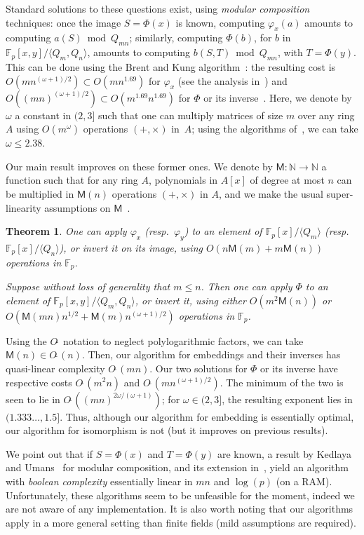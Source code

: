 \documentclass{sig-alternate}
\def\M {\ensuremath{\mathsf{M}}}
\def\N {\ensuremath{\mathbb{N}}}
\def\F {\ensuremath{\mathbb{F}}}
\newcounter{algo}
\newcommand{\ang}[1]{\langle#1\rangle}
\newtheorem{Theo}{Theorem}
\begin{document}
Standard solutions to these questions exist, using {\em modular
  composition} techniques: once the image $S=\Phi(x)$ is known,
computing $\varphi_x(a)$ amounts to computing $a(S) \bmod Q_{mn}$;
similarly, computing $\Phi(b)$, for $b$ in $\F_p[x,y]/\ang{Q_m,Q_n}$,
amounts to computing $b(S,T) \bmod Q_{mn}$, with $T=\Phi(y)$.  This
can be done using the Brent and Kung algorithm~\cite{brent+kung}: the
resulting cost is $O(m n^{(\omega+1)/2}) \subset O(m n^{1.69})$ for
$\varphi_x$ (see the analysis in~\cite{shoup94}) and $O((m
n)^{(\omega+1)/2}) \subset O(m^{1.69} n^{1.69})$ for $\Phi$ or its
inverse~\cite{PoSc13b}. Here, we denote by $\omega$ a constant in
$(2,3]$ such that one can multiply matrices of size $m$ over any ring
  $A$ using $O(m^\omega)$ operations $(+,\times)$ in~$A$; using the
  algorithms of~\cite{coppersmith+winograd,Williams12}, we can take
  $\omega \le 2.38$.

Our main result improves on these former ones. We denote by $\M:\N \to
\N$ a function such that for any ring $A$, polynomials in $A[x]$ of
degree at most $n$ can be multiplied in $\M(n)$ operations
$(+,\times)$ in $A$, and we make the usual super-linearity assumptions
on $\M$~\cite[Chapter~8]{vzGG}.
\begin{Theo}\label{theo:main}
  One can apply $\varphi_x$ (resp.\ $\varphi_y$) to an element of
  $\F_p[x]/\ang{Q_m}$ (resp.\ $\F_p[x]/\ang{Q_n}$), or invert it on its
  image, using $O(n\M(m)+m\M(n))$ operations in $\F_p$.

  Suppose without loss of generality that $m \le n$. Then one can
  apply $\Phi$ to an element of $\F_p[x,y]/\ang{Q_m, Q_n}$, or invert it, using either
  $O(m^2 \M(n))$ or $O(\M(mn)n^{1/2}+\M(m) n^{(\omega+1)/2} )$
  operations in $\F_p$.
\end{Theo}

Using the $O\tilde{~}$ notation to neglect polylogarithmic factors, we
can take $\M(n) \in O\tilde{~}(n)$.  Then, our algorithm for
embeddings and their inverses has quasi-linear complexity
$O\tilde{~}(mn)$. Our two solutions for $\Phi$ or its inverse have
respective costs $O\tilde{~}(m^2 n)$ and $O\tilde{~}(m
n^{(\omega+1)/2})$. The minimum of the two is seen to lie in
$O\tilde{~}( (mn)^{2\omega/(\omega+1)})$; for $\omega \in (2,3]$, the
resulting exponent lies in $(1.333\dots, 1.5]$.  Thus, although our
algorithm for embedding is essentially optimal, our algorithm for
isomorphism is not (but it improves on previous results).

We point out that if $S=\Phi(x)$ and $T=\Phi(y)$ are known, a result
by Kedlaya and Umans~\cite{KeUm11} for modular composition, and its
extension in~\cite{PoSc13a}, yield an algorithm with {\em boolean
  complexity} essentially linear in $mn$ and $\log(p)$ (on a
RAM). Unfortunately, these algorithms seem to be unfeasible for the
moment, indeed we are not aware of any implementation. It is also
worth noting that our algorithms apply in a more general setting than
finite fields (mild assumptions are required).
\end{document}
